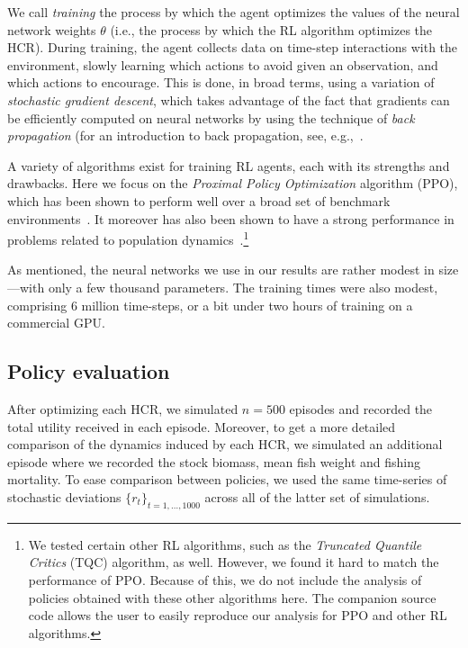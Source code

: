 \documentclass[floatfix,nofootinbib,longbibliography,notitlepage]{revtex4-2}
\begin{document}
We call \emph{training} the process by which the agent optimizes the values of the neural network weights $\theta$ (i.e., the process by which the RL algorithm optimizes the HCR). 
During training, the agent collects data on time-step interactions with the environment, slowly learning which actions to avoid given an observation, and which actions to encourage. 
This is done, in broad terms, using a variation of \emph{stochastic gradient descent}, which takes advantage of the fact that gradients can be efficiently computed on neural networks by using the technique of \emph{back propagation} (for an introduction to back propagation, see, e.g.,~\cite[Chapter~7]{rojas1996}.

A variety of algorithms exist for training RL agents, each with its strengths and drawbacks.
Here we focus on the \emph{Proximal Policy Optimization} algorithm (PPO), which has been shown to perform well over a broad set of benchmark environments~\cite{schulman-ppo}. 
It moreover has also been shown to have a strong performance in problems related to population dynamics~\cite{lapeyrolerie-rl,prettydarngood}.\footnote{
 We tested certain other RL algorithms, such as the \emph{Truncated Quantile Critics} (TQC) algorithm, as well. 
 However, we found it hard to match the performance of PPO. 
 Because of this, we do not include the analysis of policies obtained with these other algorithms here. 
 The companion source code allows the user to easily reproduce our analysis for PPO and other RL algorithms.
}

As mentioned, the neural networks we use in our results are rather modest in size—with only a few thousand parameters. 
The training times were also modest, comprising 6 million time-steps, or a bit under two hours of training on a commercial GPU.


\subsection{Policy evaluation}
\label{sec:evaluation}

After optimizing each HCR, we simulated $n=500$ episodes and recorded the total utility received in each episode. 
Moreover, to get a more detailed comparison of the dynamics induced by each HCR, we simulated an additional episode where we recorded the stock biomass, mean fish weight and fishing mortality. 
To ease comparison between policies, we used the same time-series of stochastic deviations $\{r_t\}_{t=1,\dots,1000}$ across all of the latter set of simulations.
\end{document}
